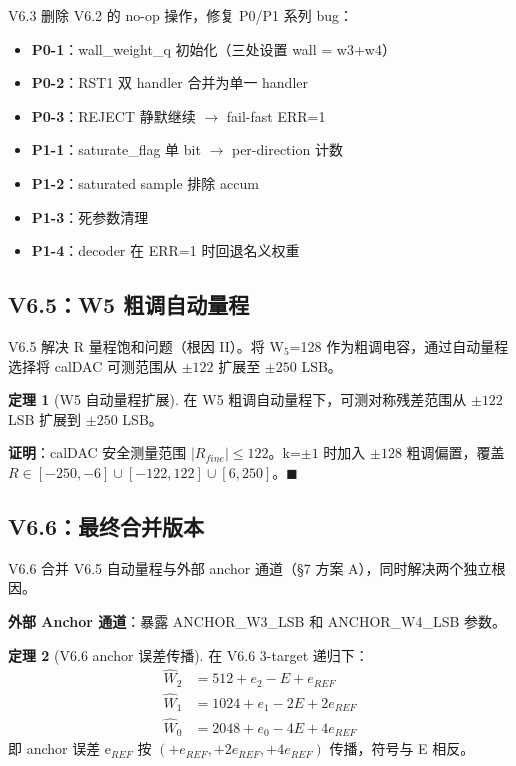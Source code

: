 \documentclass[UTF8,a4paper,12pt]{ctexart}
\theoremstyle{definition}
\newtheorem{theorem}{定理}[section]
\begin{document}
V6.3 删除 V6.2 的 no-op 操作，修复 P0/P1 系列 bug：
\begin{itemize}
  \item \textbf{P0-1}：wall\_weight\_q 初始化（三处设置 wall = w3+w4）
  \item \textbf{P0-2}：RST1 双 handler 合并为单一 handler
  \item \textbf{P0-3}：REJECT 静默继续 $\to$ fail-fast ERR=1
  \item \textbf{P1-1}：saturate\_flag 单 bit $\to$ per-direction 计数
  \item \textbf{P1-2}：saturated sample 排除 accum
  \item \textbf{P1-3}：死参数清理
  \item \textbf{P1-4}：decoder 在 ERR=1 时回退名义权重
\end{itemize}

\subsection{V6.5：W5 粗调自动量程}

V6.5 解决 R 量程饱和问题（根因 II）。将 W$_5$=128 作为粗调电容，通过自动量程
选择将 calDAC 可测范围从 $\pm 122$ 扩展至 $\pm 250$ LSB。

\begin{theorem}[W5 自动量程扩展]
在 W5 粗调自动量程下，可测对称残差范围从 $\pm 122$ LSB 扩展到 $\pm 250$ LSB。
\end{theorem}

\textbf{证明}：calDAC 安全测量范围 $|R_{fine}| \leq 122$。k=$\pm 1$ 时加入
$\pm 128$ 粗调偏置，覆盖 $R \in [-250, -6] \cup [-122, 122] \cup [6, 250]$。$\blacksquare$

\subsection{V6.6：最终合并版本}

V6.6 合并 V6.5 自动量程与外部 anchor 通道（§7 方案 A），同时解决两个独立根因。

\textbf{外部 Anchor 通道}：暴露 ANCHOR\_W3\_LSB 和 ANCHOR\_W4\_LSB 参数。

\begin{theorem}[V6.6 anchor 误差传播]
在 V6.6 3-target 递归下：
\begin{align*}
\hat W_2 &= 512 + e_2 - E + e_{REF} \\
\hat W_1 &= 1024 + e_1 - 2E + 2e_{REF} \\
\hat W_0 &= 2048 + e_0 - 4E + 4e_{REF}
\end{align*}
即 anchor 误差 e$_{REF}$ 按 $(+e_{REF}, +2e_{REF}, +4e_{REF})$ 传播，符号与 E 相反。
\end{theorem}
\end{document}
